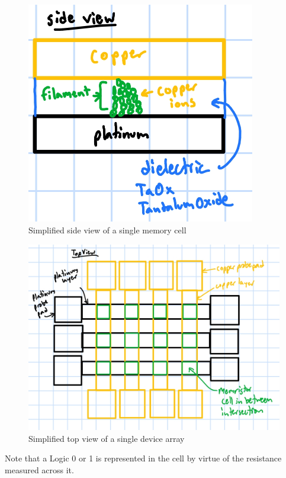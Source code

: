\documentclass{article}
\begin{document}
          \begin{figure}[H]
            \centering
            \includegraphics[width=10cm]{./figures/sideview_drawing.jpg}
            \caption{Simplified side view of a single memory cell}
            \label{sideview}
          \end{figure}
          \begin{figure}[H]
            \centering
            \includegraphics[width=\textwidth]{./figures/topview_drawing.jpg}
            \caption{Simplified top view of a single device array}
            \label{topview}
          \end{figure}

          Note that a Logic 0 or 1 is represented in the cell by virtue of the resistance measured across it.
\end{document}

